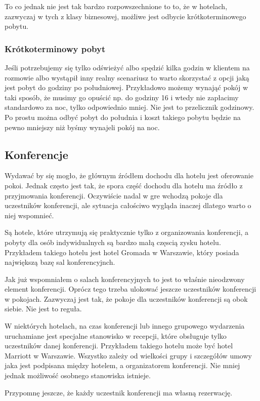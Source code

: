 \documentclass[12pt, a4paper]{article}
\begin{document}
To co jednak nie jest tak bardzo rozpowszechnione to to, że w hotelach,
zazwyczaj w tych z klasy biznesowej, możliwe jest odbycie krótkoterminowego
pobytu.
\subsubsection{Krótkoterminowy pobyt}
Jeśli potrzebujemy się tylko odświeżyć albo spędzić kilka godzin w klientem na
rozmowie albo wystąpił inny realny scenariusz to warto skorzystać z opcji jaką
jest pobyt do godziny po południowej.
Przykładowo możemy wynająć pokój w taki sposób, że musimy go opuścić np. do
godziny 16 i wtedy nie zapłacimy standardowo za noc, tylko odpowiednio mniej.
Nie jest to przelicznik godzinowy. Po prostu można odbyć pobyt do południa i
koszt takiego pobytu będzie na pewno mniejszy niż byśmy wynajeli pokój na noc.

\subsection{Konferencje}
Wydawać by się mogło, że głównym źródłem dochodu dla hotelu jest oferowanie
pokoi. Jednak często jest tak, że spora część dochodu dla hotelu ma źródło z
przyjmowania konferencji. Oczywiście nadal w gre wchodzą pokoje dla uczestników
konferencji, ale sytuacja całościwo wygląda inaczej dlatego warto o niej
wspomnieć.

Są hotele, które utrzymują się praktycznie tylko z organizowania konferencji, a
pobyty dla osób indywidualnych są bardzo małą częscią zysku hotelu. Przykładem
takiego hotelu jest hotel Gromada w Warszawie, który posiada największą bazę sal konferencyjnch.

Jak już wspomniałem o salach konferencyjnych to jest to właśnie nieodzwony
element konferencji. Oprócz tego trzeba ulokować jeszcze uczestników
konferencji w pokojach. Zazwyczaj jest tak, że pokoje dla uczestników
konferencji są obok siebie. Nie jest to reguła.

W niektórych hotelach, na czas konferencji lub innego grupowego wydarzenia
uruchamiane jest specjalne stanowisko w recepcji, które obsługuje tylko
uczestników danej konferencji. Przykładem takiego hotelu może być hotel Marriott
w Warszawie. Wszystko zależy od wielkości grupy i szczegółów umowy jaka jest
podpisana między hotelem, a organizatorem konferencji. Nie mniej jednak
możliwość osobnego stanowiska istnieje. 

Przypomnę jeszcze, że każdy uczestnik konferencji ma własną rezerwację.
\end{document}
